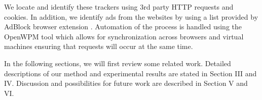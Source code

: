 \documentclass[conference]{IEEEtran}
\begin{document}
We locate and identify these trackers using 3rd party HTTP requests and cookies. In addition, we identify ads from the websites by using a list provided by AdBlock browser extension \cite{adblock}. Automation of the process is handled using the OpenWPM \cite{openwpm} tool which allows for synchronization across browsers and virtual machines ensuring that requests will occur at the same time. 

In the following sections, we will first review some related work. Detailed descriptions of our method and experimental results are stated in Section III and IV. Discussion and possibilities for future work are described in Section V and VI.







%
%
\end{document}
